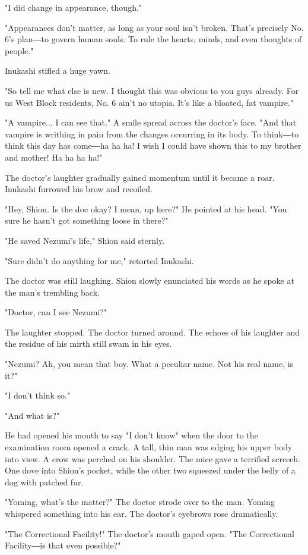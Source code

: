 "I did change in appearance, though."

"Appearances don't matter, as long as your soul isn't broken. That's
precisely No. 6's plan―to govern human souls. To rule the hearts, minds,
and even thoughts of people."

Inukashi stifled a huge yawn.

"So tell me what else is new. I thought this was obvious to you guys
already. For us West Block residents, No. 6 ain't no utopia. It's like a
bloated, fat vampire."

"A vampire... I can see that." A smile spread across the doctor's face.
"And that vampire is writhing in pain from the changes occurring in its
body. To think―to think this day has come―ha ha ha! I wish I could have
shown this to my brother and mother! Ha ha ha ha!"

The doctor's laughter gradually gained momentum until it became a roar.
Inukashi furrowed his brow and recoiled.

"Hey, Shion. Is the doc okay? I mean, up here?" He pointed at his head.
"You sure he hasn't got something loose in there?"

"He saved Nezumi's life," Shion said sternly.

"Sure didn't do anything for me," retorted Inukashi.

The doctor was still laughing. Shion slowly enunciated his words as he
spoke at the man's trembling back.

"Doctor, can I see Nezumi?"

The laughter stopped. The doctor turned around. The echoes of his
laughter and the residue of his mirth still swam in his eyes.

"Nezumi? Ah, you mean that boy. What a peculiar name. Not his real name,
is it?"

"I don't think so."

"And what is?"

He had opened his mouth to say "I don't know" when the door to the
examination room opened a crack. A tall, thin man was edging his upper
body into view. A crow was perched on his shoulder. The mice gave a
terrified screech. One dove into Shion's pocket, while the other two
squeezed under the belly of a dog with patched fur.

"Yoming, what's the matter?" The doctor strode over to the man. Yoming
whispered something into his ear. The doctor's eyebrows rose
dramatically.

"The Correctional Facility!" The doctor's mouth gaped open. "The
Correctional Facility―is that even possible?"

